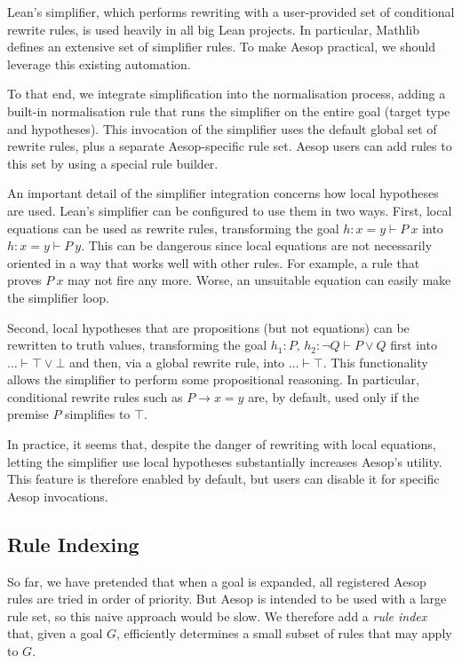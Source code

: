Lean's simplifier, which performs rewriting with a user-provided set of conditional rewrite rules, is used heavily in all big Lean projects.
In particular, Mathlib~\cite{Mathlib} defines an extensive set of simplifier rules.
To make Aesop practical, we should leverage this existing automation.

To that end, we integrate simplification into the normalisation process, adding a built-in normalisation rule that runs the simplifier on the entire goal (target type and hypotheses).
This invocation of the simplifier uses the default global set of rewrite rules, plus a separate Aesop-specific rule set.
Aesop users can add rules to this set by using a special  rule builder.

An important detail of the simplifier integration concerns how local hypotheses are used.
Lean's simplifier can be configured to use them in two ways.
First, local equations can be used as rewrite rules, transforming the goal $h : x = y ⊢ P~x$ into $h : x = y ⊢ P~y$.
This can be dangerous since local equations are not necessarily oriented in a way that works well with other rules.
For example, a rule that proves $P~x$ may not fire any more.
Worse, an unsuitable equation can easily make the simplifier loop.

Second, local hypotheses that are propositions (but not equations) can be rewritten to truth values, transforming the goal $h_{1} : P,\, h_{2} : ¬ Q ⊢ P ∨ Q$ first into $\dots ⊢ ⊤ ∨ ⊥$ and then, via a global rewrite rule, into $\dots ⊢ ⊤$.
This functionality allows the simplifier to perform some propositional reasoning.
In particular, conditional rewrite rules such as $P → x = y$ are, by default, used only if the premise $P$ simplifies to $⊤$.

In practice, it seems that, despite the danger of rewriting with local equations, letting the simplifier use local hypotheses substantially increases Aesop's utility.
This feature is therefore enabled by default, but users can disable it for specific Aesop invocations.


\subsection{Rule Indexing}%
\label{sec:aesop:indexing}

So far, we have pretended that when a goal is expanded, all registered Aesop rules are tried in order of priority.
But Aesop is intended to be used with a large rule set, so this naive approach would be slow.
We therefore add a \emph{rule index} that, given a goal $G$, efficiently determines a small subset of rules that may apply to $G$.


